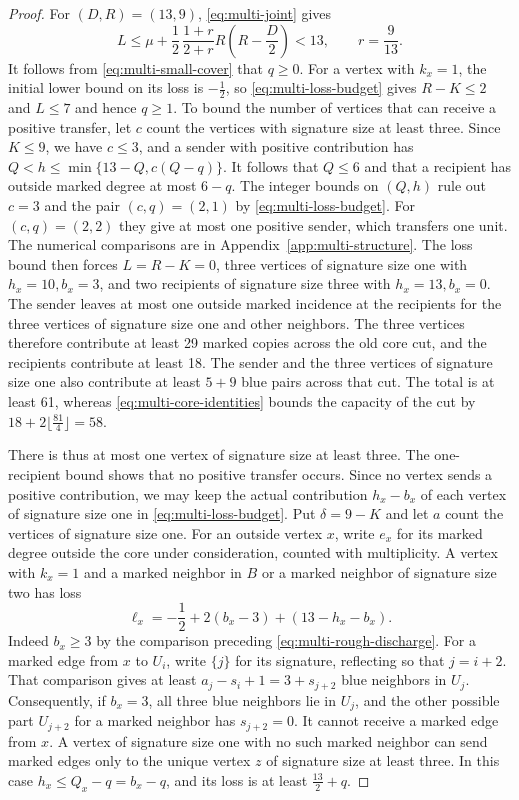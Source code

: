 \documentclass[preprint,11pt,numbers]{elsarticle-arxiv}
\numberwithin{equation}{section}
\theoremstyle{definition}
\begin{document}
\begin{proof}
For $(D,R)=(13,9)$, \eqref{eq:multi-joint} gives
\[
 L\le \mu+\frac{1}{2}\,\frac{1+r}{2+r}R(R-\frac{D}{2})<13,\qquad r=\frac{9}{13} .
\]
It follows from \eqref{eq:multi-small-cover} that $q\ge0$.
For a vertex with $k_x=1$, the initial lower bound on its loss is $-\frac{1}{2}$, so
\eqref{eq:multi-loss-budget} gives $R-K\le2$ and $L\le7$ and
hence $q\ge1$. To bound the number of vertices that can receive a positive transfer,
let $c$ count the vertices with signature size at least three.
Since $K\le9$, we have $c\le3$, and a sender with positive
contribution has $Q<h\le\min\{13-Q,c(Q-q)\}$. It follows that
$Q\le6$ and that a recipient has outside marked degree at most
$6-q$. The integer bounds on $(Q,h)$ rule out $c=3$ and
the pair $(c,q)=(2,1)$ by \eqref{eq:multi-loss-budget}. For
$(c,q)=(2,2)$ they give at most one positive sender, which transfers
one unit. The numerical comparisons are in Appendix~\ref{app:multi-structure}.
The loss bound then forces $L=R-K=0$, three vertices of signature
size one with $h_x=10,b_x=3$, and two recipients of signature
size three with $h_x=13,b_x=0$. The sender leaves at most one
outside marked incidence at the recipients for the three vertices
of signature size one and other neighbors. The three vertices
therefore contribute at least 29 marked copies across the old
core cut, and the recipients contribute at least 18. The sender
and the three vertices of signature size one also contribute at
least $5+9$ blue pairs across that cut. The total is at least 61,
whereas \eqref{eq:multi-core-identities} bounds the capacity of
the cut by $18+2\lfloor\frac{81}{4}\rfloor=58$.

There is thus at most one vertex of signature size at least three.
The one-recipient bound shows that no positive transfer occurs.
Since no vertex sends a positive contribution, we may keep the actual
contribution $h_x-b_x$ of each vertex of signature size one in
\eqref{eq:multi-loss-budget}. Put $\delta=9-K$ and
let $a$ count the vertices of signature size one. For an outside
vertex $x$, write $e_x$ for its marked degree outside the core under
consideration, counted with multiplicity. A vertex with $k_x=1$ and a marked
neighbor in $B$ or a marked neighbor of signature size two has loss
\[
 \ell_x=-\frac{1}{2}+2(b_x-3)+(13-h_x-b_x).
\]
Indeed $b_x\ge3$ by the comparison preceding
\eqref{eq:multi-rough-discharge}. For a marked edge from $x$ to
$U_i$, write $\{j\}$ for its signature, reflecting so that $j=i+2$.
That comparison gives at least $a_j-s_i+1=3+s_{j+2}$ blue neighbors
in $U_j$. Consequently, if $b_x=3$, all three blue neighbors lie in
$U_j$, and the other possible part $U_{j+2}$ for a marked neighbor
has $s_{j+2}=0$. It cannot receive a marked edge from $x$. A vertex
of signature size one with no such marked neighbor can send marked
edges only to the unique vertex $z$ of signature size at least three.
In this case $h_x\le Q_x-q=b_x-q$, and its loss is at least
$\frac{13}{2}+q$.


\end{proof}
\end{document}
